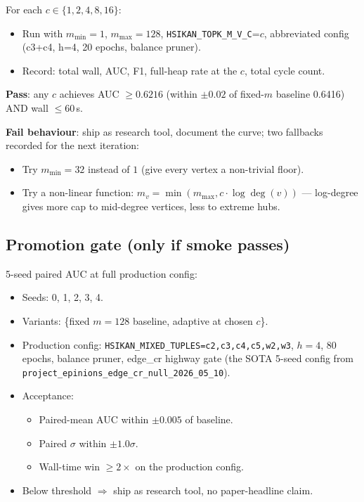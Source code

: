 \documentclass[a4paper,11pt]{article}
\begin{document}
For each $c \in \{1, 2, 4, 8, 16\}$:

\begin{itemize}
  \item Run with $m_\text{min} = 1$, $m_\text{max} = 128$,
    \texttt{HSIKAN\_TOPK\_M\_V\_C}=$c$, abbreviated config (c3+c4,
    h=4, 20 epochs, balance pruner).
  \item Record: total wall, AUC, F1, full-heap rate at the $c$,
    total cycle count.
\end{itemize}

\textbf{Pass}: any $c$ achieves AUC $\ge 0.6216$ (within $\pm 0.02$
of fixed-$m$ baseline 0.6416) AND wall $\le 60$\,s.

\textbf{Fail behaviour}: ship as research tool, document the curve;
two fallbacks recorded for the next iteration:

\begin{itemize}
  \item Try $m_\text{min} = 32$ instead of $1$ (give every vertex
    a non-trivial floor).
  \item Try a non-linear function: $m_v = \min(m_\text{max}, c
    \cdot \log\deg(v))$ — log-degree gives more cap to mid-degree
    vertices, less to extreme hubs.
\end{itemize}

\subsection*{Promotion gate (only if smoke passes)}

5-seed paired AUC at full production config:

\begin{itemize}
  \item Seeds: 0, 1, 2, 3, 4.
  \item Variants: \{fixed $m=128$ baseline, adaptive at chosen $c$\}.
  \item Production config: \texttt{HSIKAN\_MIXED\_TUPLES=c2,c3,c4,c5,w2,w3},
    $h=4$, 80 epochs, balance pruner, edge\_cr highway gate (the
    SOTA 5-seed config from
    \texttt{project\_epinions\_edge\_cr\_null\_2026\_05\_10}).
  \item Acceptance:
    \begin{itemize}
      \item Paired-mean AUC within $\pm 0.005$ of baseline.
      \item Paired $\sigma$ within $\pm 1.0\sigma$.
      \item Wall-time win $\ge 2\times$ on the production config.
    \end{itemize}
  \item Below threshold $\Rightarrow$ ship as research tool, no
    paper-headline claim.
\end{itemize}
\end{document}
